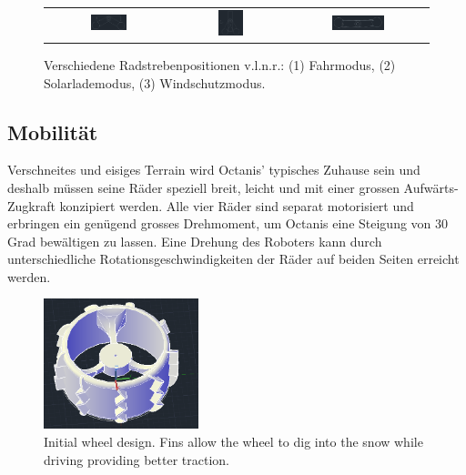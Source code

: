 \documentclass[a4paper,12pt]{article}
\begin{document}
\begin{figure}[h!]
\centering
\begin{tabular}{ c  c  c }
\includegraphics[width=0.3\textwidth]{drive} & \includegraphics[width=0.25\textwidth]{upright} & \includegraphics[width=0.4\textwidth]{flat} \\
\end{tabular}
\caption{Verschiedene Radstrebenpositionen v.l.n.r.: (1) Fahrmodus, (2) Solarlademodus, (3) Windschutzmodus.}
	\label{wheelconfig}
\end{figure}


\subsection{Mobilität}
Verschneites und eisiges Terrain wird Octanis' typisches Zuhause sein und deshalb müssen seine Räder speziell breit, leicht und mit einer grossen Aufwärts-Zugkraft konzipiert werden. Alle vier Räder sind separat motorisiert und erbringen ein genügend grosses Drehmoment, um Octanis eine Steigung von 30 Grad bewältigen zu lassen. Eine Drehung des Roboters kann durch unterschiedliche Rotationsgeschwindigkeiten der Räder auf beiden Seiten erreicht werden.

\begin{figure}[h!]
	\centering
    \includegraphics[width=0.4\textwidth]{wheel}
    \caption{Initial wheel design. Fins allow the wheel to dig into the snow while driving providing better traction.}
\end{figure}
\end{document}
